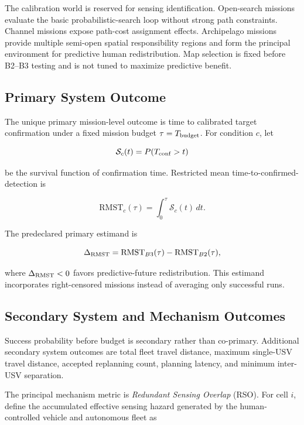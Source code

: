 \documentclass[conference]{IEEEtran}
\begin{document}
The calibration world is reserved for sensing identification. Open-search
missions evaluate the basic probabilistic-search loop without strong path
constraints. Channel missions expose path-cost assignment effects. Archipelago
missions provide multiple semi-open spatial responsibility regions and form the
principal environment for predictive human redistribution. Map selection is
fixed before B2--B3 testing and is not tuned to maximize predictive benefit.

\subsection{Primary System Outcome}

The unique primary mission-level outcome is time to calibrated target
confirmation under a fixed mission budget $\tau=T_{\rm budget}$. For condition
$c$, let

\begin{equation}
\mathcal{S}_c(t)=P(T_{\rm conf}>t)
\label{eq:mission_survival}
\end{equation}

be the survival function of confirmation time. Restricted mean
time-to-confirmed-detection is

\begin{equation}
\mathrm{RMST}_c(\tau)=\int_0^{\tau}\mathcal{S}_c(t)\,dt.
\label{eq:rmst}
\end{equation}

The predeclared primary estimand is

\begin{equation}
\Delta_{\rm RMST}
=\mathrm{RMST}_{B3}(\tau)-\mathrm{RMST}_{B2}(\tau),
\label{eq:delta_rmst}
\end{equation}

where $\Delta_{\rm RMST}<0$ favors predictive-future redistribution. This
estimand incorporates right-censored missions instead of averaging only
successful runs.

\subsection{Secondary System and Mechanism Outcomes}

Success probability before budget is secondary rather than co-primary.
Additional secondary system outcomes are total fleet travel distance, maximum
single-USV travel distance, accepted replanning count, planning latency, and
minimum inter-USV separation.

The principal mechanism metric is \emph{Redundant Sensing Overlap} (RSO). For
cell $i$, define the accumulated effective sensing hazard generated by the
human-controlled vehicle and autonomous fleet as
\end{document}
